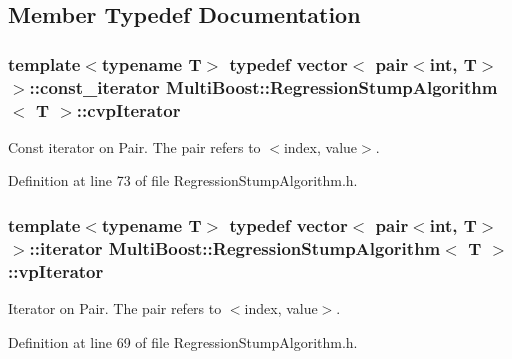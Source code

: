 \subsection{Member Typedef Documentation}
\hypertarget{classMultiBoost_1_1RegressionStumpAlgorithm_a08d7e7996cf0dfa4011419b3529d7014}{
\subsubsection[{cvp\-Iterator}]{\setlength{\rightskip}{0pt plus 5cm}template$<$typename T$>$ typedef vector$<$ pair$<$int, T$>$ $>$\-::const\-\_\-iterator {\bf Multi\-Boost\-::\-Regression\-Stump\-Algorithm}$<$ T $>$\-::{\bf cvp\-Iterator}}}\label{classMultiBoost_1_1RegressionStumpAlgorithm_a08d7e7996cf0dfa4011419b3529d7014}
Const iterator on Pair. The pair refers to $<$index, value$>$. 

Definition at line 73 of file Regression\-Stump\-Algorithm.\-h.

\hypertarget{classMultiBoost_1_1RegressionStumpAlgorithm_a2b15b3238653298e01264e1d90f2ec0f}{
\subsubsection[{vp\-Iterator}]{\setlength{\rightskip}{0pt plus 5cm}template$<$typename T$>$ typedef vector$<$ pair$<$int, T$>$ $>$\-::iterator {\bf Multi\-Boost\-::\-Regression\-Stump\-Algorithm}$<$ T $>$\-::{\bf vp\-Iterator}}}\label{classMultiBoost_1_1RegressionStumpAlgorithm_a2b15b3238653298e01264e1d90f2ec0f}
Iterator on Pair. The pair refers to $<$index, value$>$. 

Definition at line 69 of file Regression\-Stump\-Algorithm.\-h.



